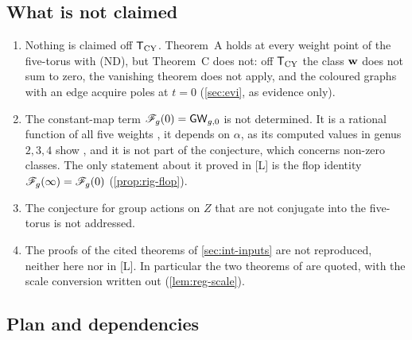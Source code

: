 \subsection{What is not claimed}
\label{sec:int-notclaimed}

\begin{enumerate}
\item Nothing is claimed off $\mathsf{T}_{\mathrm{CY}}$. Theorem~A holds at every weight point of the five-torus with (ND), but Theorem~C does not: off $\mathsf{T}_{\mathrm{CY}}$ the class $\mathbf{w}$ does not sum to zero, the vanishing theorem does not apply, and the coloured graphs with an edge acquire poles at $t=0$ (\cref{sec:evi}, as evidence only).
\item The constant-map term $\mathscr{F}_g(0)=\mathsf{GW}_{g,0}$ is not determined. It is a rational function of all five weights , it depends on $\alpha$, as its computed values in genus $2,3,4$ show , and it is not part of the conjecture, which concerns non-zero classes. The only statement about it proved in [L] is the flop identity $\mathscr{F}_g(\infty)=\mathscr{F}_g(0)$ (\cref{prop:rig-flop}).
\item The conjecture for group actions on $Z$ that are not conjugate into the five-torus is not addressed.
\item The proofs of the cited theorems of \cref{sec:int-inputs} are not reproduced, neither here nor in [L]. In particular the two theorems of \cite{LP2} are quoted, with the scale conversion written out (\cref{lem:reg-scale}).
\end{enumerate}

\subsection{Plan and dependencies}
\label{sec:int-strategy}

